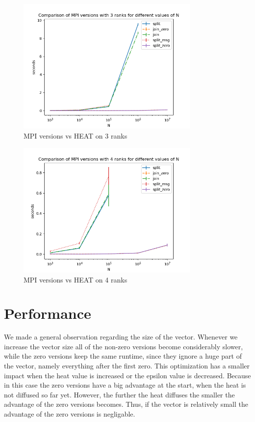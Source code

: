 \documentclass[a4paper]{article}
\begin{document}
\begin{figure}[H]
    \centering
    \includegraphics[width = 0.8\textwidth]{graphs/n/Comparison of MPI versions with 3 ranks for different values of N.png}
    \caption{MPI versions vs HEAT on 3 ranks}
    \label{fig: orig heat}
\end{figure}

\begin{figure}[H]
    \centering
    \includegraphics[width = 0.8\textwidth]{graphs/n/Comparison of MPI versions with 4 ranks for different values of N.png}
    \caption{MPI versions vs HEAT on 4 ranks}
    \label{fig: orig heat}
\end{figure}

\section{Performance}
We made a general observation regarding the size of the vector. Whenever we increase the vector size all of the non-zero versions become considerably slower, while the zero versions keep the same runtime, since they ignore a huge part of the vector, namely everything after the first zero. This optimization has a smaller impact when the heat value is increased or the epsilon value is decreased. Because in this case the zero versions have a big advantage at the start, when the heat is not diffused so far yet. However, the further the heat diffuses the smaller the advantage of the zero versions becomes. Thus, if the vector is relatively small the advantage of the zero versions is negligable.
\end{document}
